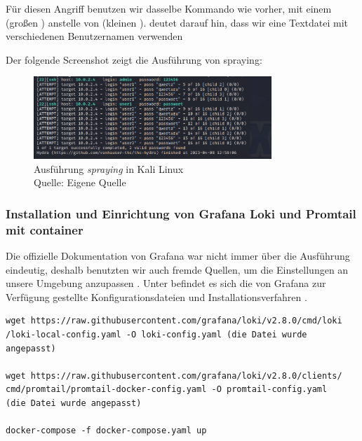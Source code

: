 Für diesen Angriff benutzen wir dasselbe Kommando wie vorher, mit einem  (großen ) anstelle von  (kleinen ).  deutet darauf hin, dass wir eine Textdatei mit verschiedenen Benutzernamen verwenden 

Der folgende Screenshot zeigt die Ausführung von \gls{spraying}:
\begin{figure}[H]
   \centering
   \includegraphics[width=0.8\textwidth]{assets/Spraying_Kali.png}
   \caption{Ausführung \textit{\gls{spraying}} in Kali Linux \\Quelle: Eigene Quelle}
   \centering
\end{figure}

\subsubsection{Installation und Einrichtung von Grafana Loki und Promtail mit \gls{container}}
Die offizielle Dokumentation von Grafana war nicht immer über die Ausführung eindeutig, deshalb benutzten wir auch fremde Quellen, um die Einstellungen an unsere Umgebung anzupassen \citep{Polinowski_PGL}. Unter befindet es sich die von Grafana zur Verfügung gestellte Konfigurationsdateien und Installationsverfahren \citep{GrafanaLoki_run}. 

{
\begin{Verbatim}[frame=single]
wget https://raw.githubusercontent.com/grafana/loki/v2.8.0/cmd/loki
/loki-local-config.yaml -O loki-config.yaml (die Datei wurde angepasst)

wget https://raw.githubusercontent.com/grafana/loki/v2.8.0/clients/
cmd/promtail/promtail-docker-config.yaml -O promtail-config.yaml 
(die Datei wurde angepasst)

docker-compose -f docker-compose.yaml up 
\end{Verbatim}
}


